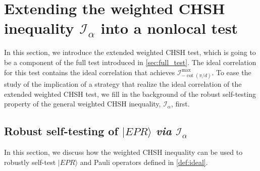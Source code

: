 \documentclass[11pt,letterpaper]{article}
\newcommand{\ket}[1]{|#1\rangle}
\newcommand{\1}{\mathbb{1}}
\newcommand{\LS}{LS}
\newcommand{\I}{\mathcal{I}}
\newtheorem{proposition}[theorem]{Proposition}
\theoremstyle{definition}
\begin{document}

\section{Extending the weighted CHSH inequality $\I_\alpha$ into a nonlocal test}
\label{sec:ext_chsh}
In this section, we introduce the extended weighted CHSH test,
which is going to be a component of the full test introduced in \cref{sec:full_test}.
The ideal correlation for this test contains the ideal correlation that 
achieves $\I_{-\cot(\pi/d)}^{\max}$. 
To ease the study of the implication of a strategy that realize 
the ideal correlation of the extended weighted CHSH test,
we fill in the background of the robust self-testing property of the
general weighted CHSH inequality, $\I_\alpha$, first.

\subsection{Robust self-testing of $\ket{EPR}$ \textit{via} $\I_\alpha$}
\label{sec:chsh}
In this section, we discuss how the weighted CHSH inequality can be used to robustly self-test $\ket{EPR}$ and Pauli operators defined in \cref{def:ideal}.
\end{document}
